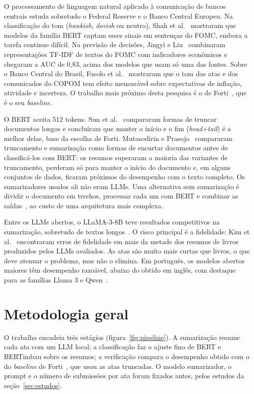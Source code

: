 \documentclass[12pt]{article}
\begin{document}
O processamento de linguagem natural aplicado à comunicação de bancos
centrais estuda sobretudo o Federal Reserve e o Banco Central Europeu. Na
classificação do tom (\textit{hawkish}, \textit{dovish} ou neutro),
Shah et al.~\cite{shah2023} mostraram que modelos da família BERT captam esses
sinais em sentenças do FOMC, embora a tarefa continue difícil. Na previsão de
decisões, Jingyi e Liu~\cite{jingyi2025} combinaram representações TF-IDF de
textos do FOMC com indicadores econômicos e chegaram a AUC de 0,83, acima dos
modelos que usam só uma das fontes. Sobre o Banco Central do Brasil, Fasolo et
al.~\cite{fasolo2022} mostraram que o tom das atas e dos comunicados do COPOM
tem efeito mensurável sobre expectativas de inflação, atividade e incerteza. O
trabalho mais próximo desta pesquisa é o de Forti~\cite{forti2025}, que é o seu
\textit{baseline}.

O BERT aceita 512 tokens. Sun et al.~\cite{sun2019} compararam formas de
truncar documentos longos e concluíram que manter o início e o fim
(\textit{head+tail}) é a melhor delas, base da escolha de Forti. Mutasodirin e
Prasojo~\cite{mutasodirin2024} compararam truncamento e sumarização como formas
de encurtar documentos antes de classificá-los com BERT: os resumos superaram a
maioria das variantes de truncamento, perderam só para manter o início do
documento e, em alguns conjuntos de dados, ficaram próximos do desempenho com o
texto completo. Os sumarizadores usados ali não eram LLMs. Uma alternativa sem
sumarização é dividir o documento em trechos, processar cada um com BERT e
combinar as saídas~\cite{pappagari2019}, ao custo de uma arquitetura mais
complexa.

Entre os LLMs abertos, o LLaMA-3-8B teve resultados competitivos na
sumarização, sobretudo de textos longos~\cite{rehman2025}. O risco principal é a
fidelidade: Kim et al.~\cite{kim2024} encontraram erros de fidelidade em mais da
metade dos resumos de livros produzidos pelos LLMs avaliados. As atas são muito
mais curtas que livros, o que deve atenuar o problema, mas não o elimina. Em
português, os modelos abertos maiores têm desempenho razoável, abaixo do obtido
em inglês, com destaque para as famílias Llama 3 e Qwen~\cite{almeida2025}.

\section{Metodologia geral}\label{sec:metodologia}

O trabalho encadeia três estágios (figura~\ref{fig:pipeline}). A sumarização
resume cada ata com um LLM local; a classificação faz o ajuste fino de BERT e
BERTimbau sobre os resumos; a verificação compara o desempenho obtido com o do
\textit{baseline} de Forti~\cite{forti2025}, que usou as atas truncadas. O
modelo sumarizador, o prompt e o número de submissões por ata foram fixados
antes, pelos estudos da seção~\ref{sec:estudos}.
\end{document}
